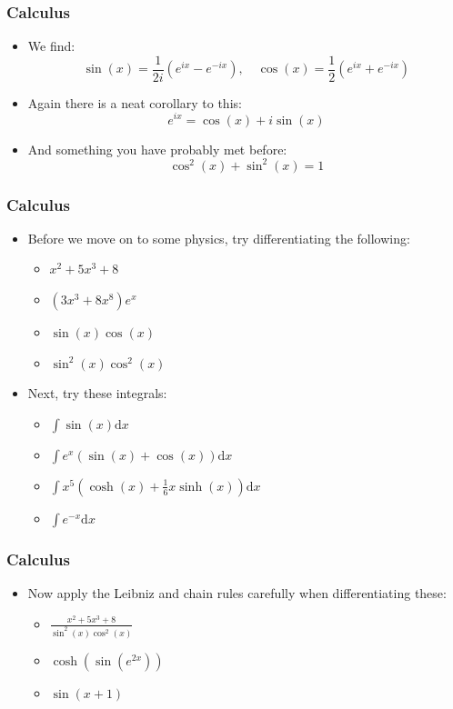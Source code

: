 \documentclass{beamer}
\begin{document}
\begin{frame}
  \frametitle{Calculus}
  \begin{itemize}
    \item<1-> We find:
      \begin{equation*}
	\sin(x)=\frac{1}{2i}\left( e^{ix}-e^{-ix} \right), \quad \cos(x)=\frac{1}{2}\left( e^{ix}+e^{-ix} \right)
      \end{equation*}
    \item<2-> Again there is a neat corollary to this:
      \begin{equation*}
	e^{ix}=\cos(x)+i\sin(x)
      \end{equation*}
    \item<3-> And something you have probably met before:
      \begin{equation*}
	\cos^2(x)+\sin^2(x)=1
      \end{equation*}
  \end{itemize}
\end{frame}

\begin{frame}
  \frametitle{Calculus}
  \begin{itemize}
    \item<1-> Before we move on to some physics, try differentiating the following:
      \begin{itemize}
	\item<2-> $x^2+5x^3+8$
	\item<3-> $\left( 3x^3+8x^8 \right)e^x$
	\item<4-> $\sin(x)\cos(x)$
	\item<5-> $\sin^2(x)\cos^2(x)$
      \end{itemize}
    \item<6-> Next, try these integrals:
      \begin{itemize}
	\item<7-> $\int \sin(x)\mathrm{d}x$
	\item<8-> $\int e^x\left( \sin(x)+\cos(x) \right)\mathrm{d}x$
	\item<9-> $\int x^5\left( \cosh(x)+\frac{1}{6}x\sinh(x) \right)\mathrm{d}x$
	\item<10> $\int e^{-x}\mathrm{d}x$
      \end{itemize}
  \end{itemize}
\end{frame}

\begin{frame}
  \frametitle{Calculus}
  \begin{itemize}
    \item<1-> Now apply the Leibniz and chain rules carefully when differentiating these:
      \begin{itemize}
	\item<2-> $\frac{x^2+5x^3+8}{\sin^2(x)\cos^2(x)}$
	\item<3-> $\cosh(\sin(e^{2x}))$
	\item<4-> $\sin(x+1)$
      \end{itemize}
  \end{itemize}
\end{frame}
\end{document}
